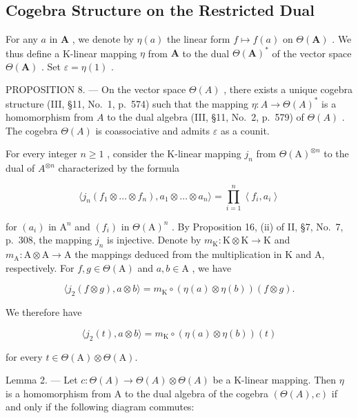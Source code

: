\subsection{Cogebra Structure on the Restricted Dual}

For any \(a\) in \(\mathbf{A}\) , we denote by \(\eta(a)\) the linear form \(f \mapsto f(a)\) on \(\Theta(\mathbf{A})\) . We thus define a K-linear mapping \(\eta\) from \(\mathbf{A}\) to the dual \(\Theta(\mathbf{A})^*\) of the vector space \(\Theta(\mathbf{A})\) . Set \(\varepsilon = \eta(1)\) .

PROPOSITION 8. --- On the vector space \(\Theta(A)\) , there exists a unique cogebra structure (III, §11, No.~1, p.~574) such that the mapping \(\eta: A \to \Theta(A)^*\) is a homomorphism from \(A\) to the dual algebra (III, §11, No.~2, p.~579) of \(\Theta(A)\) . The cogebra \(\Theta(A)\) is coassociative and admits \(\varepsilon\) as a counit.

For every integer \(n \geqslant 1\) , consider the K-linear mapping \(j_{n}\) from \(\Theta(\mathrm{A})^{\otimes n}\) to the dual of \(A^{\otimes n}\) characterized by the formula

\[
\langle j _ {n} \left(f _ {1} \otimes \dots \otimes f _ {n}\right), a _ {1} \otimes \dots \otimes a _ {n} \rangle = \prod_ {i = 1} ^ {n} \left\langle f _ {i}, a _ {i} \right\rangle\tag{13}
\]

for \((a_{i})\) in \(\mathrm{A}^n\) and \((f_i)\) in \(\Theta (\mathrm{A})^n\) . By Proposition 16, (ii) of II, §7, No.~7, p.~308, the mapping \(j_{n}\) is injective. Denote by \(m_{\mathrm{K}}:\mathrm{K}\otimes \mathrm{K}\to \mathrm{K}\) and \(m_{\mathrm{A}}:\mathrm{A}\otimes \mathrm{A}\rightarrow \mathrm{A}\) the mappings deduced from the multiplication in K and A, respectively. For \(f,g\in \Theta (\mathrm{A})\) and \(a,b\in \mathrm{A}\) , we have

\[
\langle j _ {2} (f \otimes g), a \otimes b \rangle = m _ {\mathrm{K}} \circ (\eta (a) \otimes \eta (b)) (f \otimes g).
\]

We therefore have

\[
\langle j _ {2} (t), a \otimes b \rangle = m _ {\mathrm{K}} \circ (\eta (a) \otimes \eta (b)) (t)\tag{14}
\]

for every \(t\in \Theta (\mathrm{A})\otimes \Theta (\mathrm{A})\).

Lemma 2. --- Let \(c: \Theta(A) \to \Theta(A) \otimes \Theta(A)\) be a K-linear mapping. Then \(\eta\) is a homomorphism from A to the dual algebra of the cogebra \((\Theta(A), c)\) if and only if the following diagram commutes:

